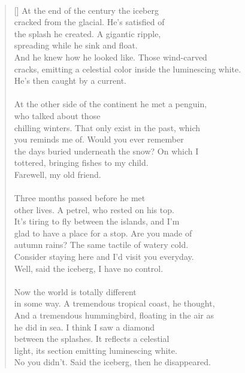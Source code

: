 \documentclass{book}
\begin{document}
\newpage
\poemtitle{\textcolor[RGB]{165,15,15}{The penguin, the petrel, \\the hummingbird and the iceberg}}
\hspace*{\fill} \\
\settowidth{\versewidth}{cracks, emitting a celestial color inside the luminescing white.}
\begin{verse}[\versewidth]
    At the end of the century the iceberg\\
    cracked from the glacial. He's satisfied of\\
    the splash he created. A gigantic ripple, \\
    spreading while he sink and float. \\
    And he knew how he looked like. Those wind-carved\\
    cracks, emitting a celestial color inside the luminescing white.\\
    He's then caught by a current. \\
    \hspace*{\fill} \\
    At the other side of the continent he met a penguin, \\
    who talked about those\\
    chilling winters. That only exist in the past, which\\
    you reminds me of. Would you ever remember \\
    the days buried underneath the snow? On which I\\
    tottered, bringing fishes to my child.\\
    Farewell, my old friend.\\
    \hspace*{\fill} \\
    Three months passed before he met\\
    other lives. A petrel, who rested on his top.\\
    It's tiring to fly between the islands, and I'm\\
    glad to have a place for a stop. Are you made of\\
    autumn rains? The same tactile of watery cold.\\
    Consider staying here and I'd visit you everyday.\\
    Well, said the iceberg, I have no control.\\
    \hspace*{\fill} \\
    Now the world is totally different\\
    in some way. A tremendous tropical coast, he thought,\\
    And a tremendous hummingbird, floating in the air as \\
    he did in sea. I think I saw a diamond \\
    between the splashes. It reflects a celestial\\
    light, its section emitting luminescing white. \\
    No you didn't. Said the iceberg, then he disappeared.\\
\end{verse}
\end{document}
